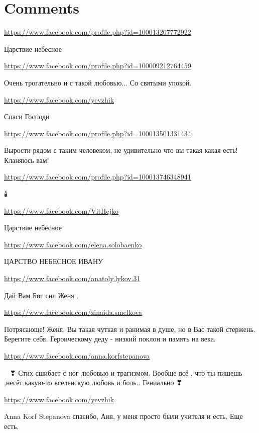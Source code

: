 \documentclass[a4paper,11pt]{extreport}
\begin{document}
\section{Comments}
\begin{itemize}
\url{https://www.facebook.com/profile.php?id=100013267772922}

Царствие небесное

\url{https://www.facebook.com/profile.php?id=100009212764459}

Очень трогательно и с такой любовью... Со святыми упокой.

\url{https://www.facebook.com/yevzhik}

Спаси Господи

\url{https://www.facebook.com/profile.php?id=100013501331434}

Вырости рядом с таким человеком, не удивительно что вы такая какая есть! Кланяюсь вам!

\url{https://www.facebook.com/profile.php?id=100013746348941}

🕯️🙏

\url{https://www.facebook.com/VitHejko}

Царствие небесное

\url{https://www.facebook.com/elena.solobaenko}

ЦАРСТВО НЕБЕСНОЕ ИВАНУ

\url{https://www.facebook.com/anatoly.lykov.31}

Дай Вам Бог сил Женя .

\url{https://www.facebook.com/zinaida.smelkova}

Потрясающе! Женя, Вы такая чуткая и ранимая в душе, но в Вас такой стержень. Берегите себя. Героическому деду - низкий поклон и память на века.

\url{https://www.facebook.com/anna.korfstepanova}

🙏🙏🙏❣
Стих сшибает с ног любовью и трагизмом.
Вообще всё , что ты пишешь ,несёт какую-то вселенскую любовь и боль..
Гениально ❣

\begin{itemize}
\url{https://www.facebook.com/yevzhik}

Anna Korf Stepanova спасибо, Аня, у меня просто были учителя и есть. Еще есть.


\end{itemize}
\end{itemize}
\end{document}
